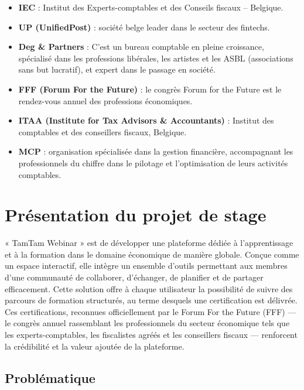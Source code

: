 \begin{itemize}
    \item \textbf{IEC} : Institut des Experts-comptables et des Conseils fiscaux -- Belgique.
    \item \textbf{UP (UnifiedPost)} : société belge leader dans le secteur des fintechs.
    \item \textbf{Deg \& Partners} : C'est un bureau comptable en pleine croissance, spécialisé
    dans les professions libérales, les artistes et les ASBL (associations sans but lucratif),
    et expert dans le passage en société.
    \item \textbf{FFF (Forum For the Future)} : le congrès Forum for the Future est le rendez-vous
    annuel des professions économiques.
    \item \textbf{ITAA (Institute for Tax Advisors \& Accountants)} : Institut des comptables et
    des conseillers fiscaux, Belgique.
    \item \textbf{MCP} : organisation spécialisée dans la gestion financière, accompagnant les
    professionnels du chiffre dans le pilotage et l'optimisation de leurs activités comptables.
\end{itemize}

\section{Présentation du projet de stage}

« TamTam Webinar » est de développer une plateforme dédiée à l'apprentissage et à la
formation dans le domaine économique de manière globale. Conçue comme un espace interactif,
elle intègre un ensemble d'outils permettant aux membres d'une communauté de collaborer,
d'échanger, de planifier et de partager efficacement. Cette solution offre à chaque utilisateur
la possibilité de suivre des parcours de formation structurés, au terme desquels une certification
est délivrée. Ces certifications, reconnues officiellement par le Forum For the Future (FFF) ---
le congrès annuel rassemblant les professionnels du secteur économique tels que les
experts-comptables, les fiscalistes agréés et les conseillers fiscaux --- renforcent la crédibilité
et la valeur ajoutée de la plateforme.

\subsection{Problématique}

